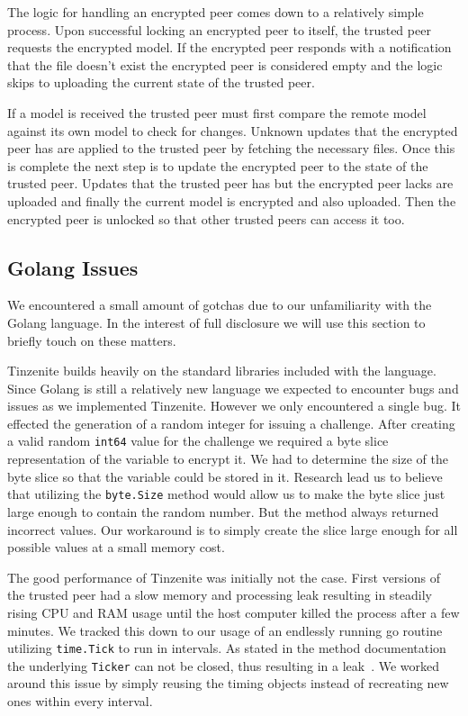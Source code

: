 The logic for handling an encrypted peer comes down to a relatively simple process.
Upon successful locking an encrypted peer to itself, the trusted peer requests the encrypted model.
If the encrypted peer responds with a notification that the file doesn't exist the encrypted peer is considered empty and the logic skips to uploading the current state of the trusted peer.

If a model is received the trusted peer must first compare the remote model against its own model to check for changes.
Unknown updates that the encrypted peer has are applied to the trusted peer by fetching the necessary files.
Once this is complete the next step is to update the encrypted peer to the state of the trusted peer.
Updates that the trusted peer has but the encrypted peer lacks are uploaded and finally the current model is encrypted and also uploaded.
Then the encrypted peer is unlocked so that other trusted peers can access it too.

\subsection{Golang Issues}
\label{sub:Golang Issues}

We encountered a small amount of gotchas due to our unfamiliarity with the Golang language.
In the interest of full disclosure we will use this section to briefly touch on these matters.

Tinzenite builds heavily on the standard libraries included with the language.
Since Golang is still a relatively new language we expected to encounter bugs and issues as we implemented Tinzenite.
However we only encountered a single bug.
It effected the generation of a random integer for issuing a challenge.
After creating a valid random \texttt{int64} value for the challenge we required a byte slice representation of the variable to encrypt it.
We had to determine the size of the byte slice so that the variable could be stored in it.
Research lead us to believe that utilizing the \texttt{byte.Size} method would allow us to make the byte slice just large enough to contain the random number.
But the method always returned incorrect values.
Our workaround is to simply create the slice large enough for all possible values at a small memory cost.

The good performance of Tinzenite was initially not the case.
First versions of the trusted peer had a slow memory and processing leak resulting in steadily rising CPU and RAM usage until the host computer killed the process after a few minutes.
We tracked this down to our usage of an endlessly running go routine utilizing \texttt{time.Tick} to run in intervals.
As stated in the method documentation the underlying \texttt{Ticker} can not be closed, thus resulting in a leak~\cite{web:site:golang:time:tick}.
We worked around this issue by simply reusing the timing objects instead of recreating new ones within every interval.

